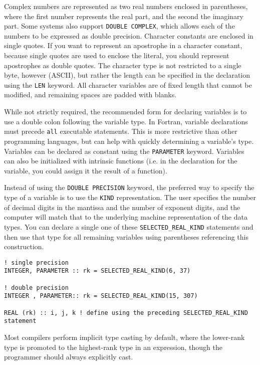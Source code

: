 \documentclass[10pt]{article}
\begin{document}
Complex numbers are represented as two real numbers enclosed in parentheses, where the first number represents the real part, and the second the imaginary part. Some systems also support {\tt DOUBLE COMPLEX}, which allows each of the numbers to be expressed as double precision. Character constants are enclosed in single quotes. If you want to represent an apostrophe in a character constant, because single quotes are used to enclose the literal, you should represent apostrophes as double quotes. The character type is not restricted to a single byte, however (ASCII), but rather the length can be specified in the declaration using the {\tt LEN} keyword. All character variables are of fixed length that cannot be modified, and remaining spaces are padded with blanks. 

While not strictly required, the recommended form for declaring variables is to use a double colon following the variable type. In Fortran, variable declarations must precede {\tt all} executable statements. This is more restrictive than other programming languages, but can help with quickly determining a variable's type. Variables can be declared as constant using the {\tt PARAMETER} keyword. Variables can also be initialized with intrinsic functions (i.e. in the declaration for the variable, you could assign it the result of a function). 

Instead of using the {\tt DOUBLE PRECISION} keyword, the preferred way to specify the type of a variable is to use the {\tt KIND} representation. The user specifies the number of decimal digits in the mantissa and the number of exponent digits, and the computer will match that to the underlying machine representation of the data types. You can declare a single one of these {\tt SELECTED\_REAL\_KIND} statements and then use that type for all remaining variables using parentheses referencing this construction.

\begin{lstlisting}
! single precision
INTEGER, PARAMETER :: rk = SELECTED_REAL_KIND(6, 37)

! double precision
INTEGER , PARAMETER:: rk = SELECTED_REAL_KIND(15, 307)

REAL (rk) :: i, j, k ! define using the preceding SELECTED_REAL_KIND statement
\end{lstlisting}

Most compilers perform implicit type casting by default, where the lower-rank type is promoted to the highest-rank type in an expression, though the programmer should always explicitly cast.  
\end{document}
